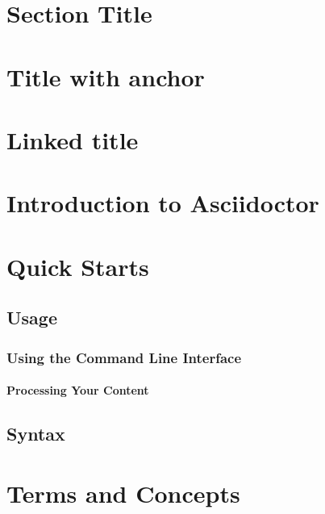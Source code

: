 \hypertarget{x-section-title}{\section*{Section Title}}

\hypertarget{x-title-with-anchor}{\section*{Title with anchor}}

\hypertarget{x-linked-title}{\section*{Linked title}}

\hypertarget{x-introduction-to-asciidoctor}{\section{Introduction to Asciidoctor}}
\hypertarget{x-quick-starts}{\section{Quick Starts}}
\hypertarget{x-usage}{\subsection{Usage}}
\hypertarget{x-using-the-command-line-interface}{\subsubsection{Using the Command Line Interface}}
\hypertarget{x-processing-your-content}{\paragraph{Processing Your Content}}
\hypertarget{x-syntax}{\subsection{Syntax}}
\hypertarget{x-terms-and-concepts}{\section{Terms and Concepts}}

